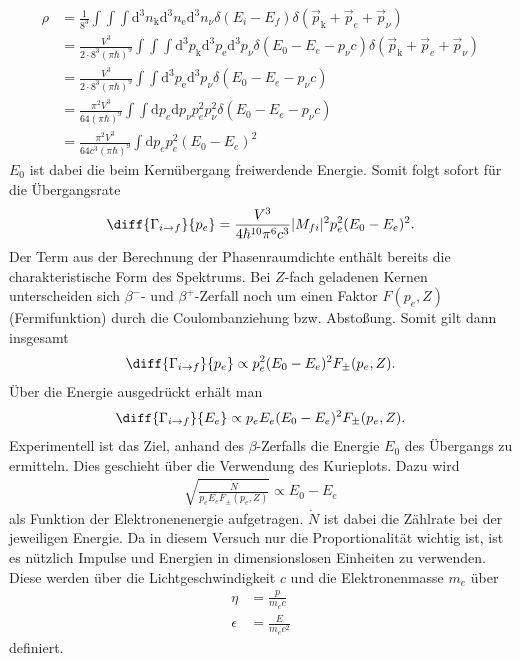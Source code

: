 \begin{align*}
  \rho&= \frac{1}{8^3}\int\int \int \mathrm{d}^3n_\mathrm{k} \mathrm{d}^3n_\mathrm{e}  \mathrm{d}^3n_\nu \delta (E_i-E_f) \delta (\vec{p}_\mathrm{k}+\vec{p}_e+\vec{p}_\nu)\\
  &=\frac{V^3}{2\cdot 8^3(\pi \hbar)^9} \int \int \int \mathrm{d}^3p_\mathrm{k}   \mathrm{d}^3p_\mathrm{e}  \mathrm{d}^3p_\nu\delta (E_0-E_e-p_\nu c) \delta (\vec{p}_\mathrm{k}+\vec{p}_e+\vec{p}_\nu)\\
  &=\frac{V^3}{2\cdot 8^3(\pi \hbar)^9}  \int \int  \mathrm{d}^3p_\mathrm{e} \mathrm{d}^3p_\nu \delta (E_0-E_e-p_\nu c)\\
  &= \frac{ \pi^2 V^3}{64(\pi \hbar)^9} \int \int \mathrm{d}p_e \mathrm{d}p_\nu p_e^2 p_\nu^2\delta (E_0-E_e-p_\nu c)\\
  &=\frac{ \pi^2 V^3}{64c^3 (\pi \hbar)^9} \int \mathrm{d}p_e p_e^2 (E_0-E_e)^2
\end{align*}
$E_0$ ist dabei die beim Kernübergang freiwerdende Energie. Somit folgt sofort für die Übergangsrate
\begin{align*}
  \diff{\Gamma_{i \rightarrow f}}{p_e}=\frac{ V^3}{4\hbar^{10} \pi^6 c^3}|M_{fi}|^2  p_e^2 (E_0-E_e)^2.
\end{align*}
Der Term aus der Berechnung der Phasenraumdichte enthält bereits die charakteristische Form des Spektrums. Bei $Z$-fach geladenen Kernen unterscheiden sich $\beta^-$- und $\beta^+$-Zerfall noch um einen Faktor $F(p_e,Z)$ (Fermifunktion) durch die Coulombanziehung bzw. Abstoßung. Somit gilt dann insgesamt 
\begin{align*}
  \diff{\Gamma_{i \rightarrow f}}{p_e} \propto p_e^2(E_0-E_e)^2 F_\pm(p_e,Z).
\end{align*}
Über die Energie ausgedrückt erhält man
\begin{align*}
  \diff{\Gamma_{i \rightarrow f}}{E_e} \propto p_eE_e(E_0-E_e)^2 F_\pm(p_e,Z).
\end{align*}
Experimentell ist das Ziel, anhand des $\beta$-Zerfalls die Energie $E_0$ des Übergangs zu ermitteln. Dies geschieht über die Verwendung des Kurieplots. Dazu wird 
\begin{align}
  \sqrt{\frac{\dot{N}}{p_eE_eF_\pm(p_e,Z)}} \propto E_0-E_e
  \label{equ:kurie}
\end{align}
als Funktion der Elektronenenergie aufgetragen. $\dot{N}$ ist dabei die Zählrate bei der jeweiligen Energie. Da in diesem Versuch nur die Proportionalität wichtig ist, ist es nützlich Impulse und Energien in dimensionslosen Einheiten zu verwenden. Diese werden über die Lichtgeschwindigkeit $c$ und die Elektronenmasse $m_e$ über
\begin{align*}
  \eta&=\frac{p}{m_ec}\\
  \epsilon&=\frac{E}{m_ec^2}
\end{align*}
definiert.\\

